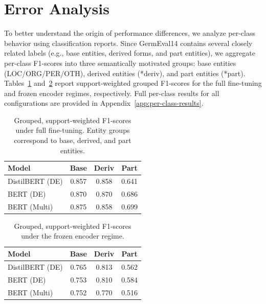 \documentclass[11pt,a4paper,twocolumn]{article}
\begin{document}
\section{Error Analysis}

To better understand the origin of performance differences, we analyze per-class behavior using classification reports.
Since GermEval14 contains several closely related labels (e.g., base entities, derived forms, and part entities), we aggregate per-class F1-scores into three semantically motivated groups: base entities (LOC/ORG/PER/OTH), derived entities (*deriv), and part entities (*part).
Tables~\ref{tab:error-grouped-full} and~\ref{tab:error-grouped-frozen} report support-weighted grouped F1-scores for the full fine-tuning and frozen encoder regimes, respectively.
Full per-class results for all configurations are provided in Appendix~\ref{app:per-class-results}.

\begin{table}[h]
\centering
\small
\begin{tabular}{lccc}
\toprule
\textbf{Model} & \textbf{Base} & \textbf{Deriv} & \textbf{Part} \\
\midrule
DistilBERT (DE) & 0.857 & 0.858 & 0.641 \\
BERT (DE)       & 0.870 & 0.870 & 0.686 \\
BERT (Multi)    & 0.875 & 0.858 & 0.699 \\
\bottomrule
\end{tabular}
\caption{Grouped, support-weighted F1-scores under full fine-tuning. Entity groups correspond to base, derived, and part entities.}
\label{tab:error-grouped-full}
\end{table}


\begin{table}[h]
\centering
\small
\begin{tabular}{lccc}
\toprule
\textbf{Model} & \textbf{Base} & \textbf{Deriv} & \textbf{Part} \\
\midrule
DistilBERT (DE) & 0.765 & 0.813 & 0.562 \\
BERT (DE)       & 0.753 & 0.810 & 0.584 \\
BERT (Multi)    & 0.752 & 0.770 & 0.516 \\
\bottomrule
\end{tabular}
\caption{Grouped, support-weighted F1-scores under the frozen encoder regime.}
\label{tab:error-grouped-frozen}
\end{table}
\end{document}
